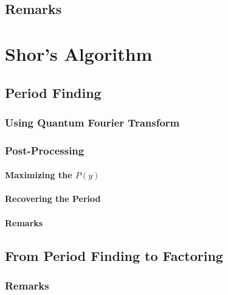 		\subsection{Remarks} %

	\section{Shor's Algorithm} %

		\subsection{Period Finding} %

			\subsubsection{Using Quantum Fourier Transform} %

			\subsubsection{Post-Processing} %

				\paragraph{Maximizing the \(P(y)\)} %

				\paragraph{Recovering the Period} %

				\paragraph{Remarks} %

		\subsection{From Period Finding to Factoring} %

			\subsubsection{Remarks} %

